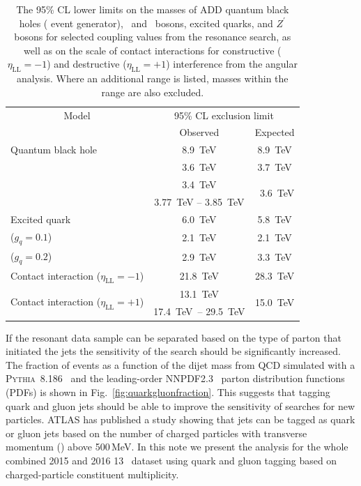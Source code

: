\begin{table}[!h]
	\centering
	\caption{The 95\% CL lower limits on the masses of ADD quantum black holes (\textsc{\BlackMax} event generator), \Wprime\ and \Wstar\ bosons, excited quarks, and $Z^\prime$ bosons for selected coupling values from the resonance search, as well as on the scale of contact interactions for constructive ($\eta_{\text{LL}}=-1$) and destructive ($\eta_{\text{LL}}=+1$) interference from the angular analysis. Where an additional range is listed, masses within the range are also excluded.}
	\begin{tabular}{ l c c}
		\toprule
		\multicolumn{1}{c}{Model} & \multicolumn{2}{c}{95\% CL exclusion limit} \\
		\cmidrule(r){2-3}
		&  Observed & Expected \\
		\midrule
		Quantum black hole &  8.9~TeV\xspace  & 8.9~TeV\xspace \\
		\midrule
		\Wprime  & 3.6~TeV\xspace &   3.7~TeV\xspace \\
		\midrule
		\multirow{2}{*}{\Wstar}  & 3.4~TeV\xspace  &    \multirow{2}{*}{~3.6~TeV\xspace}  \\
		&3.77~TeV -- 3.85~TeV & \\		
		\midrule
		Excited quark & 6.0~TeV\xspace  &   5.8~TeV\xspace  \\
		\midrule
		\Zprime ($g_q= 0.1$)  & 2.1~TeV\xspace & 2.1~TeV\xspace \\
		\midrule
		\Zprime ($g_q= 0.2$)  & 2.9~TeV\xspace & 3.3~TeV\xspace \\
		\midrule                                               
		Contact interaction ($\eta_{\text{LL}}= -1$) & 21.8~TeV\xspace\phantom{.} & 28.3~TeV\xspace\phantom{.} \\
		\midrule
		\multirow{2}{*}{Contact interaction ($\eta_{\text{LL}}= +1$)}  & 13.1~TeV\xspace\phantom{.} & \multirow{2}{*}{15.0~TeV\xspace\phantom{.}} \\
		& 17.4~TeV\xspace\ -- 29.5~TeV\xspace & \\
		\bottomrule
	\end{tabular}
	\label{tab:Limits201516}
\end{table}


If the resonant data sample can be separated  based on the type of  parton that initiated the jets the 
sensitivity of the search should be significantly increased. The fraction of events as a function of 
the dijet mass from QCD  simulated with a  \textsc{Pythia~8.186}~\cite{pythia8} and the leading-order NNPDF2.3~\cite{Ball:2012cx} parton distribution functions (PDFs) is shown in Fig.~\ref{fig:quarkgluonfraction}. 
This suggests that tagging quark and gluon jets should be able to improve the sensitivity of searches for new particles. 
ATLAS has 
published a study \cite{ATL-PHYS-PUB-2017-009} showing that jets can be tagged as quark or gluon jets 
based on the number of charged particles with transverse momentum (\pt ) above 500\,MeV. 
In this note we present the analysis for the whole combined 2015 and 2016 13~\TeV\xspace dataset using quark 
and gluon tagging  based on charged-particle constituent multiplicity.


